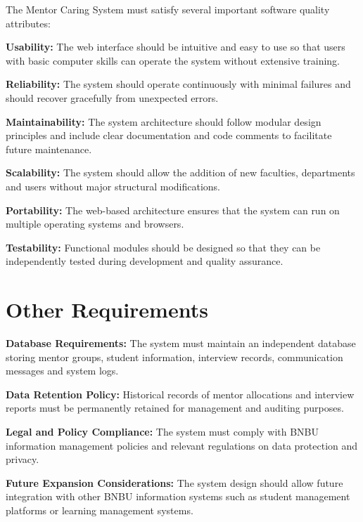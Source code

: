 \documentclass[a4paper,12pt]{article}
\begin{document}
The Mentor Caring System must satisfy several important software quality attributes:

\textbf{Usability:} The web interface should be intuitive and easy to use so that users with basic computer skills can operate the system without extensive training.

\textbf{Reliability:} The system should operate continuously with minimal failures and should recover gracefully from unexpected errors.

\textbf{Maintainability:} The system architecture should follow modular design principles and include clear documentation and code comments to facilitate future maintenance.

\textbf{Scalability:} The system should allow the addition of new faculties, departments and users without major structural modifications.

\textbf{Portability:} The web-based architecture ensures that the system can run on multiple operating systems and browsers.

\textbf{Testability:} Functional modules should be designed so that they can be independently tested during development and quality assurance.

\section{Other Requirements}

\textbf{Database Requirements:} The system must maintain an independent database storing mentor groups, student information, interview records, communication messages and system logs.

\textbf{Data Retention Policy:} Historical records of mentor allocations and interview reports must be permanently retained for management and auditing purposes.

\textbf{Legal and Policy Compliance:} The system must comply with BNBU information management policies and relevant regulations on data protection and privacy.

\textbf{Future Expansion Considerations:} The system design should allow future integration with other BNBU information systems such as student management platforms or learning management systems.


\end{document}
